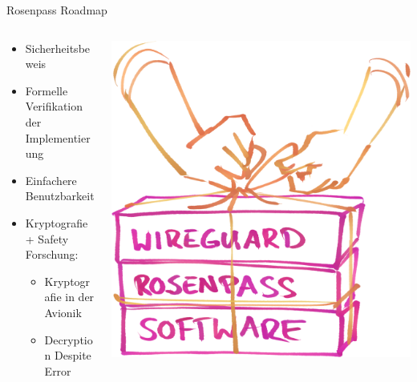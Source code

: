 \documentclass{rosenpass-beamer}
\begin{document}
\begin{frame}[fragile]{Rosenpass Roadmap}
\begin{columns}[c]
\begin{column}{0.7\textwidth}
\begin{itemize}
  \item Sicherheitsbeweis
  \item Formelle Verifikation der Implementierung
  \item Einfachere Benutzbarkeit

  \item  Kryptografie + Safety Forschung:
  \begin{itemize}
    \item Kryptografie in der Avionik
    \item Decryption Despite Error
  \end{itemize}
\end{itemize}
\end{column}

\begin{column}{0.2\textwidth}
\includegraphics[width=\linewidth]{graphics/rosenpass in anderen apps.png}


\end{column}
\end{columns}
\end{frame}
\end{document}

